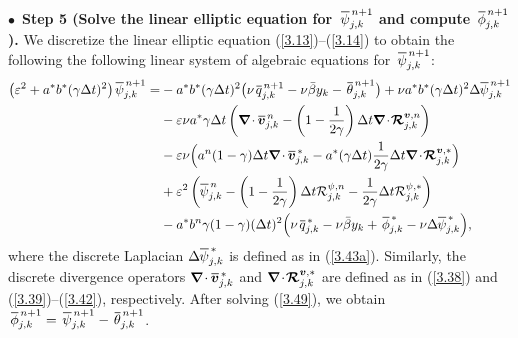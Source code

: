 \documentclass[a4paper,11pt,twoside]{article}
\numberwithin{equation}{section}
\numberwithin{figure}{section}
\numberwithin{table}{section}
\newcommand{\bnabla}{\bm{\nabla}}
\newcommand{\eps}{\varepsilon}
\newcommand{\dt}{\Delta t}
\newcommand{\bv}{\bm{v}}
\newcommand\eref[1]{(\ref{#1})}
\newcommand*\xbar[1]{%
	\hbox{%
		\vbox{%
			\hrule height 0.5pt %
			\kern0.3ex%
			\hbox{%
				\kern-0.05em%
				\ensuremath{#1}%
				\kern-0.02em%
			}%
		}%
	}%
}
\begin{document}
\smallskip
\noindent
$\bullet\,$ \textbf{Step 5 (Solve the linear elliptic equation for $\,\xbar\psi^{\,n+1}_{j,k}$ and compute $\,\xbar{\phi}^{\,n+1}_{j,k}$).}
We discretize the linear elliptic equation \eref{3.13}--\eref{3.14} to obtain the following the following linear system of algebraic
equations for $\,\xbar\psi^{\,n+1}_{j,k}$:
\begin{equation}
\begin{aligned}
\big(\eps^2+a^*b^*(\gamma\dt)^2\big)\,\xbar\psi^{\,n+1}_{j,k}=&-a^*b^*(\gamma\dt)^2\big(\nu\,\xbar q^{\,n+1}_{j,k}-\nu\bar{\beta}y_k
-\,\xbar\theta^{\,n+1}_{j,k}\big)+\nu a^*b^*(\gamma\dt)^2\Delta\xbar\psi^{\,n+1}_{j,k}\\
&-\eps\nu a^*\gamma\dt\left(\bnabla\!\cdot\xbar{\bv}^{\,n}_{j,k}-
\left(1-\frac{1}{2\gamma}\right)\dt\bnabla\!\cdot\!\bm{{\cal R}}^{\bv,n}_{j,k}\right)\\
&-\eps\nu\Big(a^n(1-\gamma)\dt\bnabla\!\cdot\xbar{\bv}^{\,*}_{j,k}-
a^*(\gamma\dt)\frac{1}{2\gamma}\dt\bnabla\!\cdot\!\bm{{\cal R}}^{\bv,*}_{j,k}\Big)\\
&+\eps^2\left(\xbar\psi^{\,n}_{j,k}-\left(1-\frac{1}{2\gamma}\right)\dt{\cal R}^{\psi,n}_{j,k}-\frac{1}{2\gamma}\dt{\cal R}^{\psi,*}_{j,k}
\right)\\
&-a^*b^n\gamma(1-\gamma)(\dt)^2\Big(\nu\,\xbar q^{\,*}_{j,k}-\nu\bar{\beta}y_k+\,\xbar{\phi}^{\,*}_{j,k}-\nu\Delta\xbar\psi^{\,*}_{j,k}
\Big),
\end{aligned}
\label{3.49}
\end{equation}
where the discrete Laplacian $\Delta\xbar\psi^{\,*}_{j,k}$ is defined as in \eref{3.43a}. Similarly, the discrete divergence operators
$\bnabla\!\cdot\xbar{\bv}^{\,*}_{j,k}$ and $\bnabla\!\cdot\!\bm{{\cal R}}^{\bv,*}_{j,k}$ are defined as in \eref{3.38} and
\eref{3.39}--\eref{3.42}, respectively. After solving \eref{3.49}, we obtain
$\,\xbar{\phi}^{\,n+1}_{j,k}=\,\xbar\psi^{\,n+1}_{j,k}-\,\xbar\theta^{\,n+1}_{j,k}$.
\end{document}
